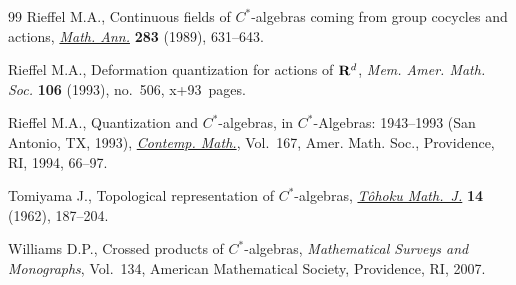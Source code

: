 \documentclass[pdftex]{sigma}
\begin{document}
\begin{thebibliography}{99}
Rief\/fel M.A., Continuous f\/ields of {$C^*$}-algebras coming from group cocycles
  and actions, \href{http://dx.doi.org/10.1007/BF01442857}{\textit{Math. Ann.}} \textbf{283} (1989), 631--643.

Rief\/fel M.A., Deformation quantization for actions of {${\bf R}^d$},
  \textit{Mem. Amer. Math. Soc.} \textbf{106} (1993), no.~506, x+93~pages.

Rief\/fel M.A., Quantization and {$C^*$}-algebras, in {$C^*$}-Algebras:
  1943--1993 ({S}an {A}ntonio, {TX}, 1993), \href{http://dx.doi.org/10.1090/conm/167/1292010}{\textit{Contemp. Math.}}, Vol.~167,
  Amer. Math. Soc., Providence, RI, 1994, 66--97.

Tomiyama J., Topological representation of {$C^*$}-algebras, \href{http://dx.doi.org/10.2748/tmj/1178244174}{\textit{T\^ohoku
  Math.~J.}} \textbf{14} (1962), 187--204.

Williams D.P., Crossed products of {$C^*$}-algebras, \textit{Mathematical
  Surveys and Monographs}, Vol.~134, American Mathematical Society, Providence,
  RI, 2007.

\end{thebibliography}\LastPageEnding
\end{document}
